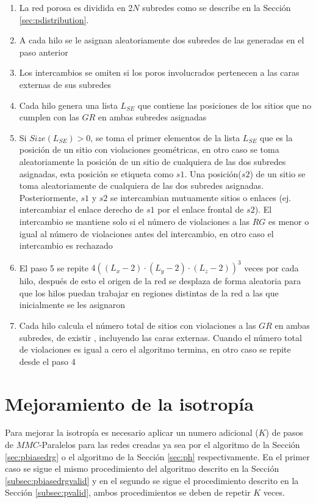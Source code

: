 \begin{enumerate}
\item La red porosa es dividida en $2N$ subredes como se describe en la Sección \ref{sec:pdistribution}.

\item A cada hilo se le asignan aleatoriamente dos subredes de las generadas en el paso anterior

\item Los intercambios se omiten si los poros involucrados pertenecen a las caras  externas de sus subredes

\item Cada hilo genera una lista $L_{SE}$ que contiene las posiciones de los sitios que no cumplen con las $GR$ en ambas subredes asignadas 

\item Si $Size(L_{SE}) > 0$, se toma el primer elementos de la lista $L_{SE}$ que es la posición de un sitio con violaciones geométricas, 
en otro caso se toma aleatoriamente la posición de un sitio de cualquiera de las dos subredes asignadas, esta posición se 
etiqueta como $s1$. Una posición($s2$) de un sitio se toma aleatoriamente de cualquiera de las dos subredes asignadas. Posteriormente, 
$s1$ y $s2$ se intercambian mutuamente sitios o enlaces (ej. intercambiar el enlace derecho de $s1$ por el enlace frontal de $s2$). El 
intercambio se mantiene solo si el número de violaciones a las $RG$ es menor o igual al número de violaciones antes del intercambio, en 
otro caso el intercambio es rechazado

\item El paso 5 se repite $4(( L_x  - 2) \cdot (L_y - 2) \cdot (L_z - 2))^3$ veces por cada hilo, después de esto el origen de la red 
se desplaza de forma aleatoria para que los hilos puedan trabajar en regiones distintas de la red a las que inicialmente se les asignaron

\item Cada hilo calcula el número total de sitios con violaciones a las $GR$ en ambas subredes, de existir , incluyendo las caras 
externas. Cuando el número total de violaciones es igual a cero el algoritmo termina, en otro caso se repite desde el paso 4
\end{enumerate}

\section{Mejoramiento de la isotropía}
\label{subsec:pisotropy}
Para mejorar la isotropía es necesario aplicar un numero adicional ($K$) de pasos de $MMC$-Paralelos para las redes creadas ya sea por 
el algoritmo de la Sección \ref{sec:pbiasedrg} o el algoritmo de la Sección \ref{sec:ph} respectivamente. En el primer caso se sigue 
el mismo procedimiento del algoritmo descrito en la Secci\'on \ref{subsec:pbiasedrgvalid} y en el segundo se sigue el procedimiento 
descrito en la Sección \ref{subsec:pvalid}, ambos procedimientos se deben de repetir $K$ veces.